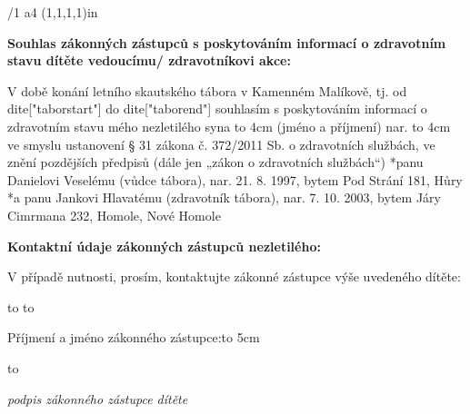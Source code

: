 
\typosize[11/13]
\margins/1 a4 (1,1,1,1)in
\chyph
\fontfam[timesroman]
\nopagenumbers
\parindent=0cm

{\bf Souhlas zákonných zástupců s poskytováním informací o zdravotním stavu dítěte vedoucímu/ zdravotníkovi akce:}

V době konání letního skautského tábora v Kamenném Malíkově, tj. od {{dite["taborstart"]}} do {{dite["taborend"]}}
souhlasím s poskytováním informací o zdravotním stavu mého nezletilého syna 
\hbox to 4cm{ \dotfill} (jméno a příjmení) nar.
\hbox to 4cm{\dotfill}
ve smyslu ustanovení § 31 zákona č. 372/2011 Sb. o zdravotních službách, ve znění pozdějších předpisů (dále jen „zákon o zdravotních službách“) 
\begitems
*panu Danielovi Veselému (vůdce tábora), nar. 21. 8. 1997, bytem Pod Strání 181, Hůry
*a panu Jankovi Hlavatému (zdravotník tábora), nar. 7. 10. 2003, bytem Járy Cimrmana 232, Homole, Nové Homole

\enditems
\bigskip

{\bf Kontaktní údaje zákonných zástupců nezletilého:}

V případě nutnosti, prosím, kontaktujte zákonné zástupce výše uvedeného dítěte:\bigskip

\hbox to 
\bigskip
\hbox to 

\vskip 2cm

\medskip
\medskip
\medskip
\medskip
\medskip
Příjmení a jméno zákonného zástupce:\hbox to 5cm{\dotfill}
\medskip
\medskip

\hbox to 

{\hfill\it\typosize[7/13]podpis zákonného zástupce dítěte}

\bye
